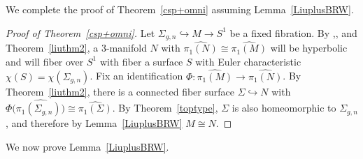\documentclass[12pt, reqno,oneside]{amsart}
\theoremstyle{definition}
\theoremstyle{plain}
\theoremstyle{TheoremNum}
\numberwithin{equation}{section}
\numberwithin{table}{section}
\begin{document}
We complete the proof of Theorem~\ref{csp+omni} assuming Lemma~\ref{LiuplusBRW}.
\begin{proof}[Proof of Theorem~\ref{csp+omni}]
Let $\Sigma_{g,n}\hookrightarrow M\to S^1$ be a fixed fibration. By \cite{WZ1},\cite{JZ}, and Theorem~\ref{liuthm2}, a 3-manifold $N$ with $\widehat{\pi_1(N)}\cong\widehat{\pi_1(M)}$ will be hyperbolic and will fiber over $S^1$ with fiber a surface $S$ with Euler characteristic $\chi(S)=\chi(\Sigma_{g,n})$. Fix an identification $\Phi:\widehat{\pi_1(M)}\to\widehat{\pi_1(N)}$. By Theorem~\ref{liuthm2}, there is a connected fiber surface $\Sigma\hookrightarrow N$ with $\Phi(\widehat{\pi_1(\Sigma_{g,n}))}\cong\widehat{\pi_1(\Sigma)}$. By Theorem~\ref{toptype}, $\Sigma$ is also homeomorphic to $\Sigma_{g,n}$, and therefore by Lemma~\ref{LiuplusBRW} $M\cong N$. 
\end{proof}
We now prove Lemma~\ref{LiuplusBRW}.
\end{document}
